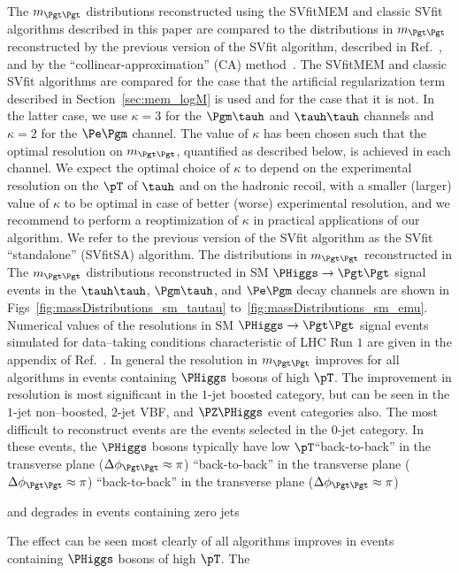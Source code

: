 {{{{The $m_{\Pgt\Pgt}$ distributions reconstructed using the 
SVfitMEM and classic SVfit algorithms described in this paper
are compared to the distributions in $m_{\Pgt\Pgt}$ reconstructed by the previous version of the
SVfit algorithm, described in Ref.~\cite{SVfit}, and by the ``collinear-approximation'' (CA)
method~\cite{massRecoCollinearApprox}.
The SVfitMEM and classic SVfit algorithms are compared for the case
that the artificial regularization term described in Section~\ref{sec:mem_logM} is used and for the case that it is not.
In the latter case, we use $\kappa = 3$ for the $\Pgm\tauh$ and $\tauh\tauh$ channels and $\kappa = 2$ for the $\Pe\Pgm$ channel.
The value of $\kappa$ has been chosen such that the optimal resolution on $m_{\Pgt\Pgt}$, quantified as described below, is achieved in each channel.
We expect the optimal choice of $\kappa$ to depend on the experimental resolution on the $\pT$ of $\tauh$ and on the hadronic recoil,
with a smaller (larger) value of $\kappa$ to be optimal in case of better (worse) experimental resolution,
and we recommend to perform a reoptimization of $\kappa$ in practical applications of our algorithm.
We refer to the previous version of the SVfit algorithm as the SVfit ``standalone'' (SVfitSA) algorithm.
The distributions in $m_{\Pgt\Pgt}$ reconstructed in 
The $m_{\Pgt\Pgt}$ distributions reconstructed in SM $\PHiggs \to \Pgt\Pgt$ signal events 
in the $\tauh\tauh$, $\Pgm\tauh$, and $\Pe\Pgm$ decay channels are shown in Figs~\ref{fig:massDistributions_sm_tautau} to~\ref{fig:massDistributions_sm_emu}.
Numerical values of the resolutions in SM $\PHiggs \to \Pgt\Pgt$ signal events simulated for data--taking conditions characteristic of LHC Run $1$
are given in the appendix of Ref.~\cite{HIG-13-004}.
In general the resolution in $m_{\Pgt\Pgt}$ improves for all algorithms in events containing $\PHiggs$ bosons of high $\pT$.
The improvement in resolution is most significant in the $1$-jet boosted category, but can be seen in the $1$-jet non--boosted, $2$-jet VBF, and $\PZ\PHiggs$ event categories also.
The most difficult to reconstruct events are the events selected in the $0$-jet category.
In these events, the $\PHiggs$ bosons typically have low $\pT$``back-to-back'' in the transverse plane ($\Delta\phi_{\Pgt\Pgt} \approx \pi$) ``back-to-back'' in the transverse plane ($\Delta\phi_{\Pgt\Pgt} \approx \pi$) ``back-to-back'' in the transverse plane ($\Delta\phi_{\Pgt\Pgt} \approx \pi$) 

and degrades in events containing zero jets


The effect can be seen most clearly
of all algorithms improves in events containing $\PHiggs$ bosons of high $\pT$.
The

}}}}
